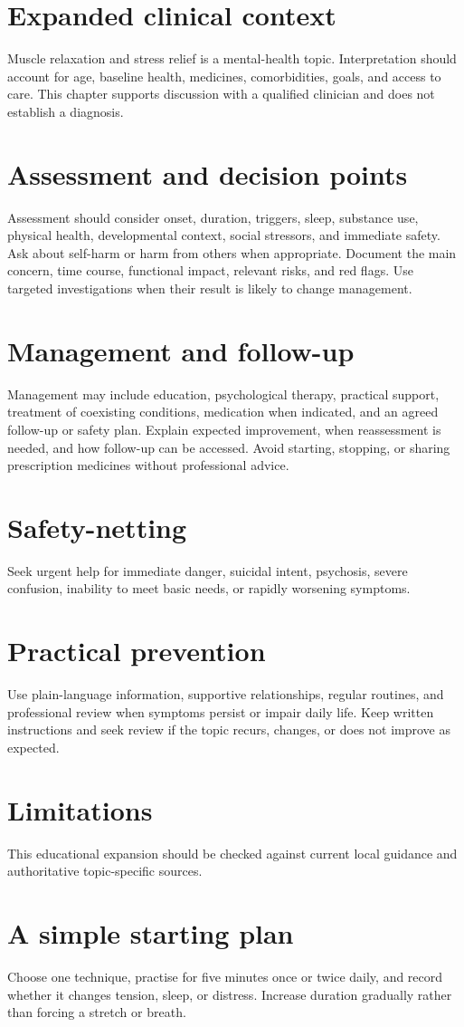\section*{Expanded clinical context}
Muscle relaxation and stress relief is a mental-health topic. Interpretation should account for age, baseline health, medicines, comorbidities, goals, and access to care. This chapter supports discussion with a qualified clinician and does not establish a diagnosis.

\section*{Assessment and decision points}
Assessment should consider onset, duration, triggers, sleep, substance use, physical health, developmental context, social stressors, and immediate safety. Ask about self-harm or harm from others when appropriate. Document the main concern, time course, functional impact, relevant risks, and red flags. Use targeted investigations when their result is likely to change management.

\section*{Management and follow-up}
Management may include education, psychological therapy, practical support, treatment of coexisting conditions, medication when indicated, and an agreed follow-up or safety plan. Explain expected improvement, when reassessment is needed, and how follow-up can be accessed. Avoid starting, stopping, or sharing prescription medicines without professional advice.

\section*{Safety-netting}
Seek urgent help for immediate danger, suicidal intent, psychosis, severe confusion, inability to meet basic needs, or rapidly worsening symptoms.

\section*{Practical prevention}
Use plain-language information, supportive relationships, regular routines, and professional review when symptoms persist or impair daily life. Keep written instructions and seek review if the topic recurs, changes, or does not improve as expected.

\section*{Limitations}
This educational expansion should be checked against current local guidance and authoritative topic-specific sources.
\section*{A simple starting plan}
Choose one technique, practise for five minutes once or twice daily, and record whether it changes tension, sleep, or distress. Increase duration gradually rather than forcing a stretch or breath.

\clearpage

